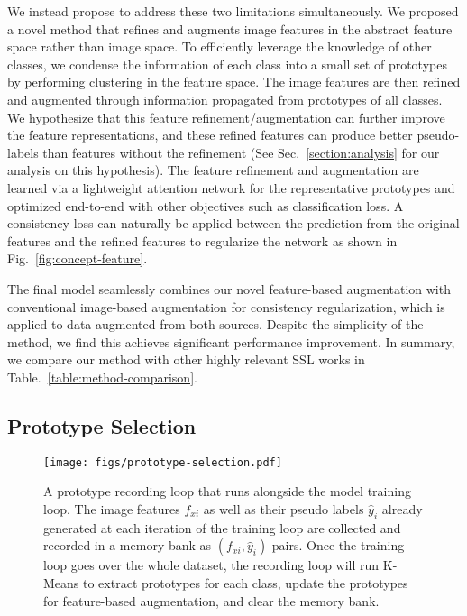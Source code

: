 \documentclass[runningheads]{llncs}
\begin{document}
We instead propose to address these two limitations simultaneously.
We proposed a novel method that refines and augments image features in the abstract feature space rather than image space.
To efficiently leverage the knowledge of other classes, we condense the information of each class into a small set of prototypes by performing clustering in the feature space.
The image features are then refined and augmented through information propagated from prototypes of all classes.
We hypothesize that this feature refinement/augmentation can further improve the feature representations, and these refined features can produce better pseudo-labels than features without the refinement (See Sec.~\ref{section:analysis} for our analysis on this hypothesis).
The feature refinement and augmentation are learned via a lightweight attention network for the representative prototypes and optimized end-to-end with other objectives such as classification loss.
A consistency loss can naturally be applied between the prediction from the original features and the refined features to regularize the network as shown in Fig.~\ref{fig:concept-feature}.

The final model seamlessly combines our novel feature-based augmentation with conventional image-based augmentation for consistency regularization, which is applied to data augmented from both sources.
Despite the simplicity of the method, we find this achieves significant performance improvement.
In summary, we compare our method with other highly relevant SSL works in Table.~\ref{table:method-comparison}.

\subsection{Prototype Selection}

\begin{figure}[t]
\centering
\texttt{[image: figs/prototype-selection.pdf]}
\caption{
A prototype recording loop that runs alongside the model training loop.
The image features $f_{xi}$ as well as their pseudo labels $\hat{y}_i$ already generated at each iteration of the training loop are collected and recorded in a memory bank as $(f_{xi}, \hat{y}_i)$ pairs.
Once the training loop goes over the whole dataset, the recording loop will run K-Means to extract prototypes for each class, update the prototypes for feature-based augmentation, and clear the memory bank.
}
\label{fig:prototype-selection}
\end{figure}
\end{document}

